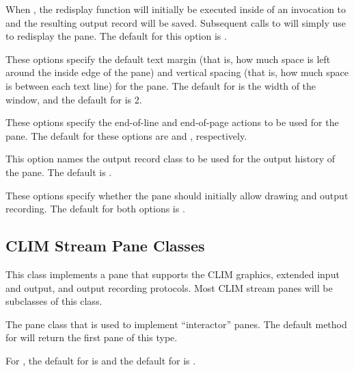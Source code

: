 
When , the redisplay function will initially be executed inside of an
invocation to  and the resulting output record will be
saved.  Subsequent calls to  will simply use
 to redisplay the pane.  The default for this option is .


These options specify the default text margin (that is, how much space is left
around the inside edge of the pane) and vertical spacing (that is, how much space
is between each text line) for the pane.  The default for  is
the width of the window, and the default for  is 2.



These options specify the end-of-line and end-of-page actions to be used for the
pane.  The default for these options are  and ,
respectively.


This option names the output record class to be used for the output history of
the pane.  The default is .


These options specify whether the pane should initially allow drawing and output
recording.  The default for both options is .


\subsection {CLIM Stream Pane Classes}


This class implements a pane that supports the CLIM graphics, extended input and
output, and output recording protocols.  Most CLIM stream panes will be
subclasses of this class.


The pane class that is used to implement ``interactor'' panes.  The default
method for  will return the first pane of this type.

For , the default for  is  and the
default for  is .

